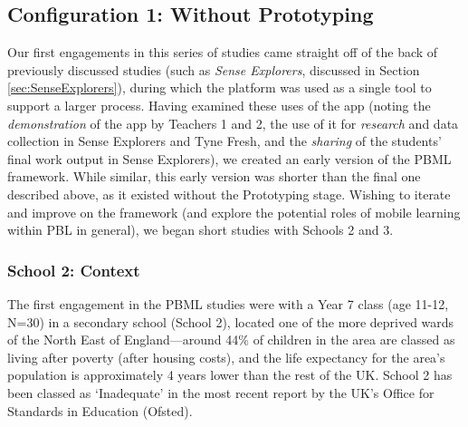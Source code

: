 \subsection{Configuration 1: Without Prototyping}
Our first engagements in this series of studies came straight off of the back of previously discussed studies (such as \textit{Sense Explorers}, discussed in Section \ref{sec:SenseExplorers}), during which the platform was used as a single tool to support a larger process. Having examined these uses of the app (noting the \textit{demonstration} of the app by Teachers 1 and 2, the use of it for \textit{research} and data collection in Sense Explorers and Tyne Fresh, and the \textit{sharing} of the students' final work output in Sense Explorers), we created an early version of the PBML framework. While similar, this early version was shorter than the final one described above, as it existed without the Prototyping stage. Wishing to iterate and improve on the framework (and explore the potential roles of mobile learning within PBL in general), we began short studies with Schools 2 and 3.

\subsubsection{School 2: Context}
The first engagement in the PBML studies were with a Year 7 class (age 11-12, N=30) in a secondary school (School 2), located one of the more deprived wards of the North East of England---around 44\% of children in the area are classed as living after poverty (after housing costs), and the life expectancy for the area's population is approximately 4 years lower than the rest of the UK. School 2 has been classed as `Inadequate' in the most recent report by the UK's Office for Standards in Education (Ofsted).

